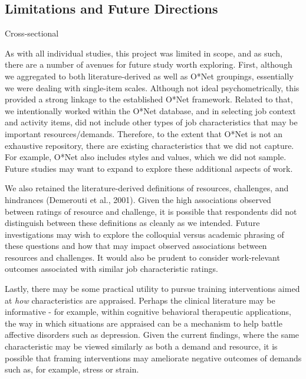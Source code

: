 \documentclass[
  man,mask]{apa7}
\begin{document}
\hypertarget{limitations-and-future-directions}{%
\subsection{Limitations and Future Directions}\label{limitations-and-future-directions}}

Cross-sectional

As with all individual studies, this project was limited in scope, and as such, there are a number of avenues for future study worth exploring. First, although we aggregated to both literature-derived as well as O*Net groupings, essentially we were dealing with single-item scales. Although not ideal psychometrically, this provided a strong linkage to the established O*Net framework. Related to that, we intentionally worked within the O*Net database, and in selecting job context and activity items, did not include other types of job characteristics that may be important resources/demands. Therefore, to the extent that O*Net is not an exhaustive repository, there are existing characteristics that we did not capture. For example, O*Net also includes styles and values, which we did not sample. Future studies may want to expand to explore these additional aspects of work.

We also retained the literature-derived definitions of resources, challenges, and hindrances (Demerouti et al., 2001). Given the high associations observed between ratings of resource and challenge, it is possible that respondents did not distinguish between these definitions as cleanly as we intended. Future investigations may wish to explore the colloquial versus academic phrasing of these questions and how that may impact observed associations between resources and challenges. It would also be prudent to consider work-relevant outcomes associated with similar job characteristic ratings.

Lastly, there may be some practical utility to pursue training interventions aimed at \emph{how} characteristics are appraised. Perhaps the clinical literature may be informative - for example, within cognitive behavioral therapeutic applications, the way in which situations are appraised can be a mechanism to help battle affective disorders such as depression. Given the current findings, where the same characteristic may be viewed similarly as both a demand and resource, it is possible that framing interventions may ameliorate negative outcomes of demands such as, for example, stress or strain.
\end{document}
